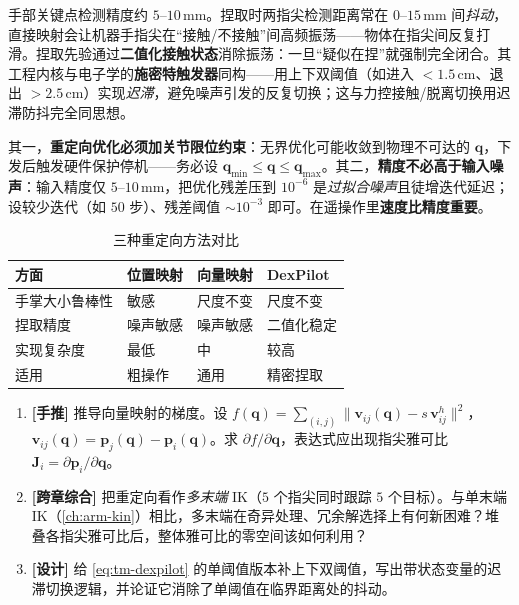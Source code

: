 \begin{insight}[捏取先验 $=$ 迟滞 $=$ 施密特触发器]\label{ins:tm-pinch}
手部关键点检测精度约 $5$--$10\,$mm。捏取时两指尖检测距离常在 $0$--$15\,$mm 间\emph{抖动}，直接映射会让机器手指尖在“接触/不接触”间高频振荡——物体在指尖间反复打滑。捏取先验通过\textbf{二值化接触状态}消除振荡：一旦“疑似在捏”就强制完全闭合。其工程内核与电子学的\textbf{施密特触发器}同构——用上下双阈值（如进入 $<1.5\,$cm、退出 $>2.5\,$cm）实现\emph{迟滞}，避免噪声引发的反复切换；这与力控接触/脱离切换用迟滞防抖完全同思想。
\end{insight}

\begin{pitfall}[两个数值陷阱]
其一，\textbf{重定向优化必须加关节限位约束}：无界优化可能收敛到物理不可达的 $\mathbf{q}$，下发后触发硬件保护停机——务必设 $\mathbf{q}_{\min}\le\mathbf{q}\le\mathbf{q}_{\max}$。其二，\textbf{精度不必高于输入噪声}：输入精度仅 $5$--$10\,$mm，把优化残差压到 $10^{-6}$ 是\emph{过拟合噪声}且徒增迭代延迟；设较少迭代（如 $50$ 步）、残差阈值 $\sim\!10^{-3}$ 即可。在遥操作里\textbf{速度比精度重要}。
\end{pitfall}

\begin{table}[H]\centering\small
\caption{三种重定向方法对比}
\label{tab:tm-retarget}
\begin{tabular}{llll}
\toprule
方面 & 位置映射 & 向量映射 & DexPilot \\
\midrule
手掌大小鲁棒性 & 敏感 & 尺度不变 & 尺度不变 \\
捏取精度 & 噪声敏感 & 噪声敏感 & 二值化稳定 \\
实现复杂度 & 最低 & 中 & 较高 \\
适用 & 粗操作 & 通用 & 精密捏取 \\
\bottomrule
\end{tabular}
\end{table}

\begin{practice}
\begin{enumerate}
  \item \textbf{[手推]} 推导向量映射的梯度。设 $f(\mathbf{q})=\sum_{(i,j)}\|\mathbf{v}_{ij}(\mathbf{q})-s\,\mathbf{v}_{ij}^{h}\|^2$，$\mathbf{v}_{ij}(\mathbf{q})=\mathbf{p}_j(\mathbf{q})-\mathbf{p}_i(\mathbf{q})$。求 $\partial f/\partial\mathbf{q}$，表达式应出现指尖雅可比 $\mathbf{J}_i=\partial\mathbf{p}_i/\partial\mathbf{q}$。
  \item \textbf{[跨章综合]} 把重定向看作\emph{多末端} IK（$5$ 个指尖同时跟踪 $5$ 个目标）。与单末端 IK（\cref{ch:arm-kin}）相比，多末端在奇异处理、冗余解选择上有何新困难？堆叠各指尖雅可比后，整体雅可比的零空间该如何利用？
  \item \textbf{[设计]} 给 \cref{eq:tm-dexpilot} 的单阈值版本补上下双阈值，写出带状态变量的迟滞切换逻辑，并论证它消除了单阈值在临界距离处的抖动。
\end{enumerate}
\end{practice}

